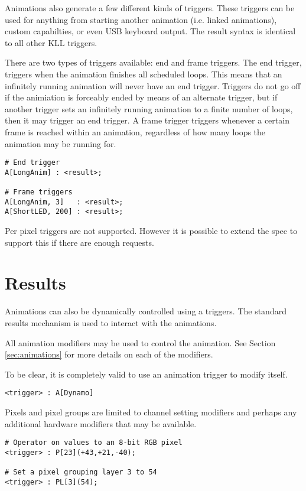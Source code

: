 \documentclass{kiibohd-template}
\begin{document}
Animations also generate a few different kinds of triggers.
These triggers can be used for anything from starting another animation (i.e. linked animations), custom capabilties, or even USB keyboard output.
The result syntax is identical to all other KLL triggers.

There are two types of triggers available: end and frame triggers.
The end trigger, triggers when the animation finishes all scheduled loops.
This means that an infinitely running animation will never have an end trigger.
Triggers do not go off if the animiation is forceably ended by means of an alternate trigger, but if another trigger sets an infinitely running animation to a finite number of loops, then it may trigger an end trigger.
A frame trigger triggers whenever a certain frame is reached within an animation, regardless of how many loops the animation may be running for.

\begin{lstlisting}
# End trigger
A[LongAnim] : <result>;

# Frame triggers
A[LongAnim, 3]   : <result>;
A[ShortLED, 200] : <result>;
\end{lstlisting}

Per pixel triggers are not supported.
However it is possible to extend the spec to support this if there are enough requests.


\section{Results}

Animations can also be dynamically controlled using a triggers.
The standard results mechanism is used to interact with the animations.

All animation modifiers may be used to control the animation.
See Section \ref{sec:animations} for more details on each of the modifiers.

To be clear, it is completely valid to use an animation trigger to modify itself.

\begin{lstlisting}
<trigger> : A[Dynamo]
\end{lstlisting}

Pixels and pixel groups are limited to channel setting modifiers and perhaps any additional hardware modifiers that may be available.

\begin{lstlisting}
# Operator on values to an 8-bit RGB pixel
<trigger> : P[23](+43,+21,-40);

# Set a pixel grouping layer 3 to 54
<trigger> : PL[3](54);
\end{lstlisting}
\end{document}
